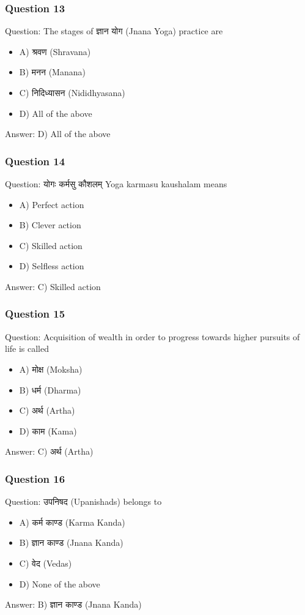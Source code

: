\begin{frame}[fragile]\frametitle{Question 13}
Question: The stages of ज्ञान योग (Jnana Yoga) practice are
\begin{itemize}
\item A) श्रवण (Shravana)
\item B) मनन (Manana)
\item C) निदिध्यासन (Nididhyasana)
\item D) All of the above
\end{itemize}
Answer: D) All of the above
\end{frame}


\begin{frame}[fragile]\frametitle{Question 14}
Question: योगः कर्मसु कौशलम् Yoga karmasu kaushalam means
\begin{itemize}
\item A) Perfect action
\item B) Clever action
\item C) Skilled action
\item D) Selfless action
\end{itemize}
Answer: C) Skilled action
\end{frame}
\begin{frame}[fragile]\frametitle{Question 15}
Question: Acquisition of wealth in order to progress towards higher pursuits of life is called
\begin{itemize}
\item A) मोक्ष (Moksha)
\item B) धर्म (Dharma)
\item C) अर्थ (Artha)
\item D) काम (Kama)
\end{itemize}
Answer: C) अर्थ (Artha)
\end{frame}

\begin{frame}[fragile]\frametitle{Question 16}
Question: उपनिषद (Upanishads) belongs to
\begin{itemize}
\item A) कर्म काण्ड (Karma Kanda)
\item B) ज्ञान काण्ड (Jnana Kanda)
\item C) वेद (Vedas)
\item D) None of the above
\end{itemize}
Answer: B) ज्ञान काण्ड (Jnana Kanda)
\end{frame}

